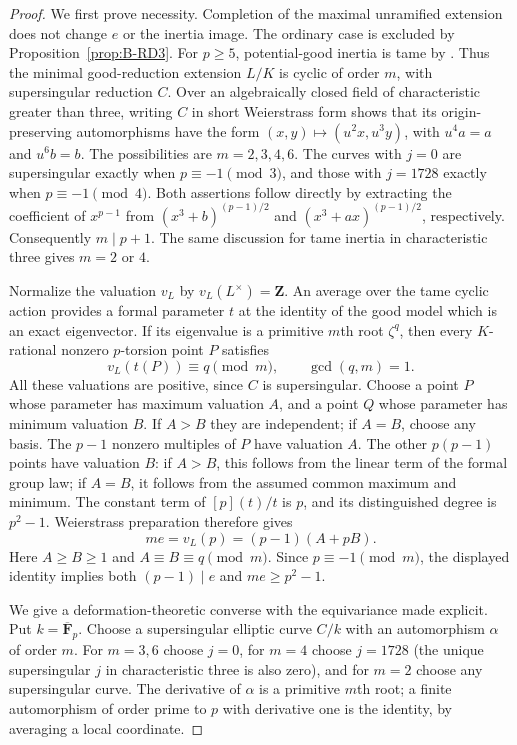 \begin{proof}
We first prove necessity. Completion of the maximal unramified extension
does not change $e$ or the inertia image. The ordinary case is excluded
by Proposition~\ref{prop:B-RD3}. For $p\geq5$, potential-good inertia is
tame by \cite[Corollary~2 of Theorem~2]{SerreTate1968Good}. Thus the
minimal good-reduction extension $L/K$ is cyclic of order $m$, with
supersingular reduction $C$. Over an algebraically closed field of
characteristic greater than three, writing $C$ in short Weierstrass form
shows that its origin-preserving automorphisms have the form
$(x,y)\mapsto(u^2x,u^3y)$, with $u^4a=a$ and $u^6b=b$.
The possibilities are $m=2,3,4,6$. The curves with $j=0$ are supersingular
exactly when $p\equiv-1\pmod3$, and those with $j=1728$ exactly when
$p\equiv-1\pmod4$. Both assertions follow directly by extracting the
coefficient of $x^{p-1}$ from $(x^3+b)^{(p-1)/2}$ and
$(x^3+ax)^{(p-1)/2}$, respectively. Consequently $m\mid p+1$.
The same discussion for tame inertia in characteristic three gives
$m=2$ or $4$.

Normalize the valuation $v_L$ by $v_L(L^\times)=\mathbf Z$.
An average over the tame cyclic action provides a formal parameter $t$
at the identity of the good model which is an exact eigenvector.
If its eigenvalue is a primitive $m$th root $\zeta^q$, then every
$K$-rational nonzero $p$-torsion point $P$ satisfies
\[
 v_L(t(P))\equiv q\pmod m,\qquad \gcd(q,m)=1.
\]
All these valuations are positive, since $C$ is supersingular. Choose a
point $P$ whose parameter has maximum valuation $A$, and a point $Q$
whose parameter has minimum valuation $B$. If $A>B$ they are independent;
if $A=B$, choose any basis. The $p-1$ nonzero multiples of $P$ have
valuation $A$. The other $p(p-1)$ points have valuation $B$: if $A>B$,
this follows from the linear term of the formal group law; if $A=B$,
it follows from the assumed common maximum and minimum.
The constant term of $[p](t)/t$ is $p$, and its distinguished degree is
$p^2-1$. Weierstrass preparation therefore gives
\[
 m e=v_L(p)=(p-1)(A+pB).                         \tag{B.7.1}
\]
Here $A\geq B\geq1$ and $A\equiv B\equiv q\pmod m$.
Since $p\equiv-1\pmod m$, the displayed identity implies both
$(p-1)\mid e$ and $me\geq p^2-1$.

We give a deformation-theoretic converse with the equivariance made
explicit. Put $k=\overline{\mathbf F}_p$. Choose a supersingular elliptic
curve $C/k$ with an automorphism $\alpha$ of order $m$. For $m=3,6$
choose $j=0$, for $m=4$ choose $j=1728$ (the unique supersingular
$j$ in characteristic three is also zero), and for $m=2$ choose any
supersingular curve. The derivative of $\alpha$ is a primitive $m$th
root; a finite automorphism of order prime to $p$ with derivative one
is the identity, by averaging a local coordinate.


\end{proof}
